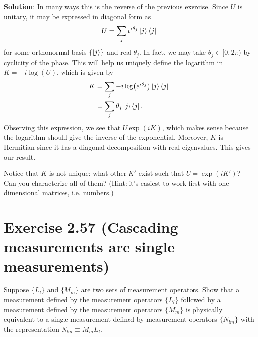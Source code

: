 \documentclass{book}
\begin{document}
    \textbf{Solution}: In many ways this is the reverse of the previous exercise. Since $U$ is unitary, it may be expressed in diagonal form as 
    \begin{align}
        U = \sum_{j} e^{i \theta_j} \ket{j}\bra{j}
    \end{align}
    for some orthonormal basis $\{\ket{j}\}$ and real $\theta_j$. In fact, we may take $\theta_j \in [0, 2\pi)$ by cyclicity of the phase. This will help us uniquely define the logarithm in $K = -i \log(U)$, which is given by
    \begin{align}
    \begin{aligned}
        K &= \sum_j -i \log(e^{i \theta_j}) \ket{j}\bra{j} \\
        &= \sum_j \theta_j \ket{j}\bra{j}.
    \end{aligned}
    \end{align}
    Observing this expression, we see that $U \exp(iK)$, which makes sense because the logarithm should give the inverse of the exponential. Moreover, $K$ is Hermitian since it has a diagonal decomposition with real eigenvalues. This gives our result.
    
    Notice that $K$ is not unique: what other $K'$ exist such that $U = \exp(iK')$? Can you characterize all of them? (Hint: it's easiest to work first with one-dimensional matrices, i.e. numbers.)
    
\section*{Exercise 2.57 (Cascading measurements are single measurements)}
	Suppose $\{L_l\}$ and $\{M_m\}$ are two sets of measurement operators. Show that a measurement defined by the measurement operators $\{L_l\}$ followed by a measurement defined by the measurement operators $\{M_m\}$ is physically equivalent to a single measurement defined by measurement operators $\{N_{lm}\}$ with the representation $N_{lm} \equiv M_m L_l$.
	
\end{document}
